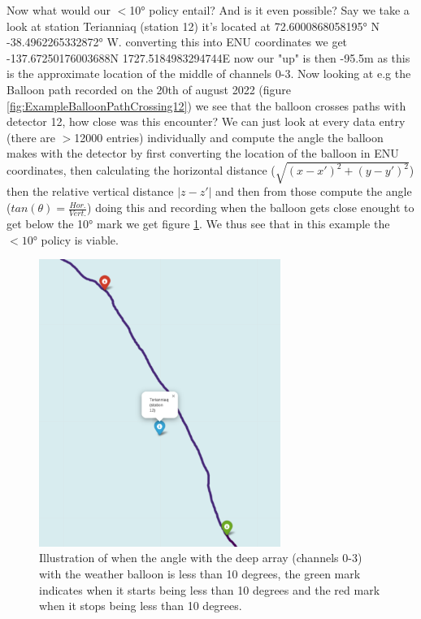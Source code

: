 \documentclass[11pt,a4paper,faculty=we,language=en,doctype=report]{cls/ugent-doc}
\begin{document}
Now what would our $<$10° policy entail? And is it even possible? 
Say we take a look at station Terianniaq (station 12)
it's located at 72.6000868058195° N -38.4962265332872° W.
converting this into ENU coordinates we get -137.67250176003688N 1727.5184983294744E now our "up" is then -95.5m as this 
is the approximate location of the middle of channels 0-3.
Now looking at e.g the Balloon path recorded on the 20th of august 2022 (figure \ref{fig:ExampleBalloonPathCrossing12})
we see that the balloon crosses paths with detector 12, how close was this encounter? We can just look at every data
entry (there are $>$12000 entries) individually and compute the angle the
balloon makes with the detector by first converting the location of the balloon
in ENU coordinates, then calculating the horizontal distance ($\sqrt{(x-x')^2 +
(y-y')^2}$) then the relative vertical distance $|z - z'|$ and then from those
compute the angle ($tan(\theta) = \frac{Hor.}{Vert.}$) doing this and recording
when the balloon gets close enought to get below the 10° mark we get figure
\ref{fig:ExampleBalloonPathCrossing12LessThan10}. We thus see that in this example the $<10$° policy is viable.
\begin{figure}
  \centering
	\includegraphics[width=0.7\textwidth]{StartAndStop10Illu.pdf}
  \caption{Illustration of when the angle with the deep array (channels 0-3) with the weather balloon is less than 10 degrees,
  the green mark indicates when it starts being less than 10 degrees and the red mark when it stops being less than 10 degrees.}
  \label{fig:ExampleBalloonPathCrossing12LessThan10}
\end{figure}
\end{document}
